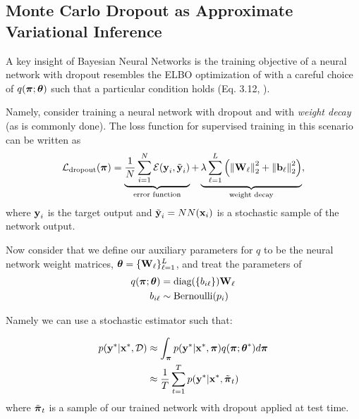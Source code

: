 \subsection{Monte Carlo Dropout as Approximate Variational Inference}
A key insight of Bayesian Neural Networks \citep{Gal2016UncertaintyThesis, Gal2016-ny} is the training objective of a neural network with dropout resembles the ELBO optimization of  with a careful choice of $q(\boldsymbol{\mathbf{\pi}}; \boldsymbol{\mathbf{\theta}})$ such that a particular condition holds (Eq. 3.12, \cite{Gal2016UncertaintyThesis}).

Namely, consider training a neural network with dropout and with \textit{weight decay} (as is commonly done). The loss function for supervised training in this scenario can be written as
\begin{equation}
\mathcal{L}_{\text{dropout}}(\boldsymbol{\mathbf{\pi}}) = \underbrace{\frac{1}{N} \sum_{i=1}^N \mathcal{E}(\boldsymbol{\mathbf{y}}_i, \tilde{\boldsymbol{\mathbf{y}}}_i)}_{\text{error function}} + \underbrace{\lambda \sum_{\ell=1}^L	\left( \left\Vert\boldsymbol{\mathbf{W}}_\ell\right\Vert_2^2 +  \left\Vert\boldsymbol{\mathbf{b}}_\ell\right\Vert_2^2\right)}_{\text{weight decay}},
\end{equation}
where $\boldsymbol{\mathbf{y}}_i$ is the target output and $\tilde{\boldsymbol{\mathbf{y}}}_i = NN(\boldsymbol{\mathbf{x}}_i)$ is a stochastic sample of the network output.

Now consider that we define our auxiliary parameters for $q$ to be the neural network weight matrices, $\boldsymbol{\mathbf{\theta}} = \{\boldsymbol{\mathbf{W}}_\ell\}_{\ell=1}^L$, and treat the parameters of
\begin{align}
	q(\boldsymbol{\mathbf{\pi}}; \boldsymbol{\mathbf{\theta}}) &= \text{diag} (\{ b_{i\ell} \}) \boldsymbol{\mathbf{W}}_\ell \\
	b_{i\ell} &\sim \text{Bernoulli}(p_i) 
\end{align}

Namely we can use a stochastic estimator such that:

\begin{align}
		p(\boldsymbol{\mathbf{y}}^* | \boldsymbol{\mathbf{x}}^*, \mathcal{D}) &\approx \int_{\boldsymbol{\mathbf{\pi}}}  p(\boldsymbol{\mathbf{y}}^* | \boldsymbol{\mathbf{x}}^*, \boldsymbol{\mathbf{\pi}}) q(\boldsymbol{\mathbf{\pi}}; \boldsymbol{\mathbf{\theta}}^*) d\boldsymbol{\mathbf{\pi}} \\
		&\approx \frac{1}{T} \sum_{t=1}^T p(\boldsymbol{\mathbf{y}}^* | \boldsymbol{\mathbf{x}}^*, \tilde{\boldsymbol{\mathbf{\pi}}}_t)
\end{align}
where $\tilde{\boldsymbol{\mathbf{\pi}}}_t$ is a sample of our trained network with dropout applied at test time.



